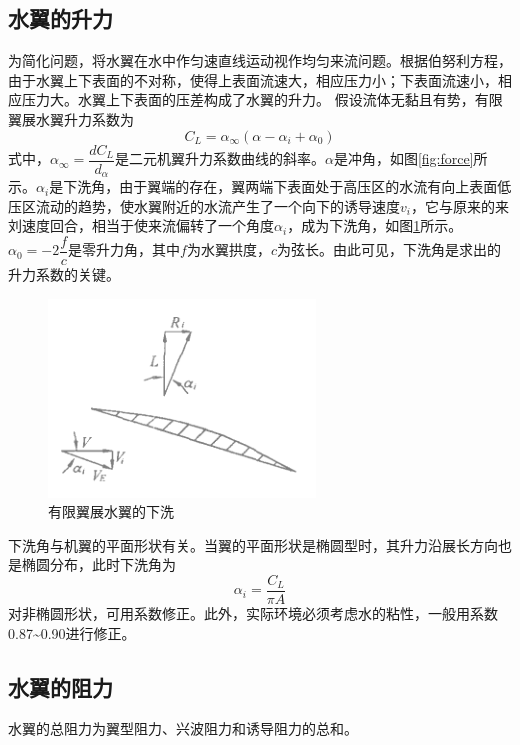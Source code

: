 \documentclass[10.5pt,twocolumn]{jbuaa}
\begin{document}
\subsection{水翼的升力}
为简化问题，将水翼在水中作匀速直线运动视作均匀来流问题。根据伯努利方程，由于水翼上下表面的不对称，使得上表面流速大，相应压力小；下表面流速小，相应压力大。水翼上下表面的压差构成了水翼的升力。
假设流体无黏且有势，有限翼展水翼升力系数为
\begin{equation}
\label{cl}
C_L = \alpha_{\infty}(\alpha - \alpha_i + \alpha_0)
\end{equation}
式中，$\alpha_{\infty} = \dfrac{dC_L}{d_{\alpha}}$是二元机翼升力系数曲线的斜率。$\alpha$是冲角，如图\ref{fig:force}所示。$\alpha_i$是下洗角，由于翼端的存在，翼两端下表面处于高压区的水流有向上表面低压区流动的趋势，使水翼附近的水流产生了一个向下的诱导速度$v_i$，它与原来的来刘速度回合，相当于使来流偏转了一个角度$\alpha_i$，成为下洗角，如图\ref{fig:downwash}所示。$\alpha_0 = -2\dfrac{f}{c}$是零升力角，其中$f$为水翼拱度，$c$为弦长。由此可见，下洗角是求出的升力系数的关键。
\begin{figure}
	\centering
	\includegraphics[scale=1,trim=0 0 0 0]{image/downwash}
	\caption{有限翼展水翼的下洗}
	\label{fig:downwash}
\end{figure}
下洗角与机翼的平面形状有关。当翼的平面形状是椭圆型时，其升力沿展长方向也是椭圆分布，此时下洗角为
\begin{equation}
\label{downwashangle}
\alpha_i = \dfrac{C_L}{\pi A}
\end{equation}
对非椭圆形状，可用系数修正。此外，实际环境必须考虑水的粘性，一般用系数0.87\~{}0.90进行修正。

\subsection{水翼的阻力}
水翼的总阻力为翼型阻力、兴波阻力和诱导阻力的总和。
\end{document}
